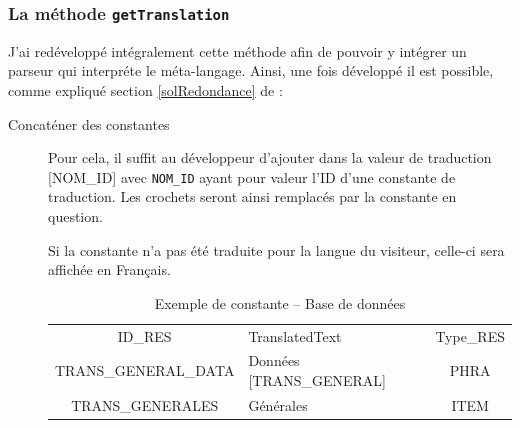 		\subsubsection{La méthode \texttt{getTranslation}}\label{exempleMetaLangage}
			J'ai redéveloppé intégralement cette méthode afin de pouvoir y intégrer un parseur qui interpréte le méta-langage.
			Ainsi, une fois développé il est possible, comme expliqué section \ref{solRedondance} de :
			\begin{description}
		\item[Concaténer des constantes]  Pour cela, il suffit au développeur d'ajouter dans la valeur de traduction [NOM\_ID] avec \texttt{NOM\_ID} ayant pour valeur l'ID d'une constante de traduction. Les crochets seront ainsi remplacés par la constante en question.

			Si la constante n'a pas été traduite pour la langue du visiteur, celle-ci sera affichée en Français.
			\begin{exemple}{}
			\begin{table}[H]
				\centering
				\begin{tabular}{|c|p{5.2cm}|c|}
					\hline
					ID\_RES & TranslatedText & Type\_RES \\
					TRANS\_GENERAL\_DATA &Données [TRANS\_GENERAL] & PHRA \\
					TRANS\_GENERALES  & Générales & ITEM \\
					\hline
				\end{tabular}\vspace{10px}
                \caption[Exemple de constante]{Exemple de constante -- Base de données}
				
				

\end{table}
\end{exemple}
\end{description}
